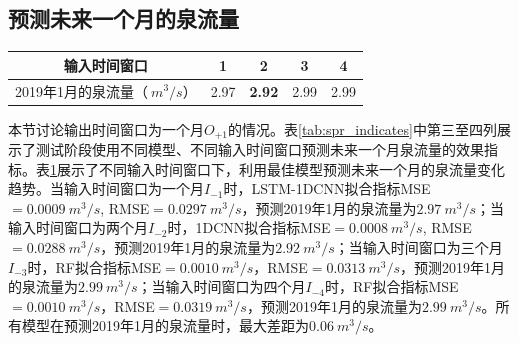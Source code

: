 {\begin{longtable}{clcccccccc}
  \end{longtable}
}

\subsection{预测未来一个月的泉流量}\label{sec:spr_one}

\begin{table}[!htbp]
  \centering
  \label{tab:spr_one}
  \footnotesize
  \begin{tabular}{ccccc}
    \toprule
    输入时间窗口 & 1 & 2 & 3 & 4\\
    \midrule
    2019年1月的泉流量（$\SI{}{m^{3}/s}$）& 2.97 & \textbf{2.92} & 2.99 & 2.99 \\
    \bottomrule
  \end{tabular}
\end{table}

本节讨论输出时间窗口为一个月$O_{+1}$的情况。表\ref{tab:spr_indicates}中第三至四列展示了测试阶段使用不同模型、不同输入时间窗口预测未来一个月泉流量的效果指标。表\ref{tab:spr_one}展示了不同输入时间窗口下，利用最佳模型预测未来一个月的泉流量变化趋势。当输入时间窗口为一个月$I_{-1}$时，LSTM-1DCNN拟合指标MSE$=\SI{0.0009}{m^{3}/s}$, RMSE$=\SI{0.0297}{m^{3}/s}$，预测2019年1月的泉流量为$\SI{2.97}{m^{3}/s}$；当输入时间窗口为两个月$I_{-2}$时，1DCNN拟合指标MSE$=\SI{0.0008}{m^{3}/s}$, RMSE$=\SI{0.0288}{m^{3}/s}$，预测2019年1月的泉流量为$\SI{2.92}{m^{3}/s}$；当输入时间窗口为三个月$I_{-3}$时，RF拟合指标MSE$=\SI{0.0010}{m^{3}/s}$，RMSE$=\SI{0.0313}{m^{3}/s}$，预测2019年1月的泉流量为$\SI{2.99}{m^{3}/s}$；当输入时间窗口为四个月$I_{-4}$时，RF拟合指标MSE$=\SI{0.0010}{m^{3}/s}$，RMSE$=\SI{0.0319}{m^{3}/s}$，预测2019年1月的泉流量为$\SI{2.99}{m^{3}/s}$。所有模型在预测2019年1月的泉流量时，最大差距为$\SI{0.06}{m^{3}/s}$。

